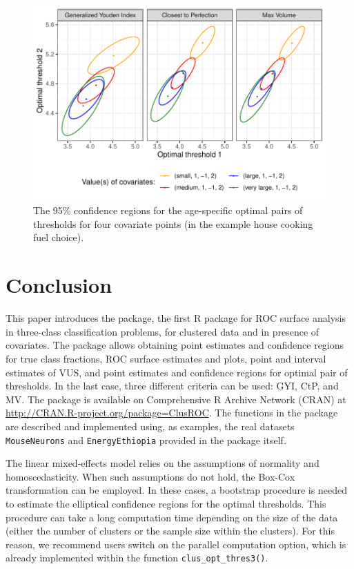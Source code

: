 {\begin{figure}[htbp]
\centering
\includegraphics[width=0.8\linewidth]{optThres_energy_ellip.pdf} 
\caption{The 95\% confidence regions for the age-specific optimal pairs of thresholds for four covariate points (in the example house cooking fuel choice).}
\label{fig:optThresh-energy}
\end{figure}
}

\hypertarget{conclusion}{%
\section{Conclusion}\label{conclusion}}
This paper introduces the  package, the first R package for ROC surface analysis in three-class classification problems, for clustered data and in presence of covariates. The package allows obtaining point estimates and confidence regions for true class fractions, ROC surface estimates and plots, point and interval estimates of VUS, and point estimates and confidence regions for optimal pair of thresholds. In the last case, three different criteria can be used: GYI, CtP, and MV. The package is available on Comprehensive R Archive Network (CRAN) at \url{http://CRAN.R-project.org/package=ClusROC}. The functions in the package are described and implemented using, as examples, the real datasets \texttt{MouseNeurons} and \texttt{EnergyEthiopia} provided in the package itself. 

{\color{blue} 
The linear mixed-effects model relies on the assumptions of normality and homoscedasticity. When such assumptions do not hold, the Box-Cox transformation can be employed.  In these cases, a bootstrap procedure is needed to estimate the elliptical confidence regions for the optimal thresholds. This procedure can take a long computation time depending on the size of the data (either the number of clusters or the sample size within the clusters). For this reason, we recommend users switch on the parallel computation option, which is already implemented within the function \texttt{clus\_opt\_thres3()}.
}


